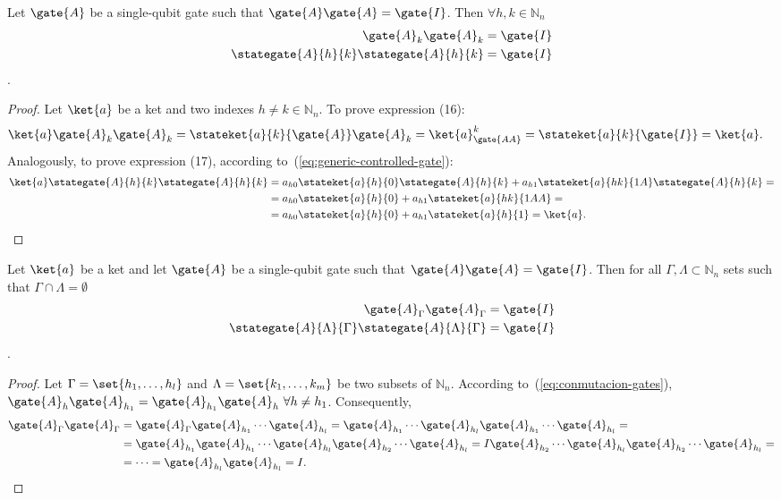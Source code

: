 \documentclass[sigconf,natbib=false]{acmart}
\begin{document}
\begin{proposition}
	Let $\gate{A}$ be a single-qubit gate such that $\gate{A}\gate{A}=\gate{I}$. Then $\forall h,k \in \mathbb{N}_n$
	\begin{align}
		\label{eq:puerta-involutiva}
		\gate{A}_k\gate{A}_k &= \gate{I}\\
		\stategate{A}{h}{k}\stategate{A}{h}{k} &= \gate{I}
	\end{align}
	.
\end{proposition}
\begin{proof}
	Let $\ket{a}$ be a ket and two indexes $h\neq k \in \mathbb{N}_n$.
	To prove expression (16):
	\begin{align*}
		\ket{a}\gate{A}_k\gate{A}_k
		&=\stateket{a}{k}{\gate{A}}\gate{A}_k=\ket{a}^k_{\gate{AA}}=\stateket{a}{k}{\gate{I}}=\ket{a}.
	\end{align*}
	Analogously, to prove expression (17), according to~(\ref{eq:generic-controlled-gate}):
	\begin{align*}
		\ket{a}\stategate{A}{h}{k}\stategate{A}{h}{k}
		&=a_{h0}\stateket{a}{h}{0}\stategate{A}{h}{k}+a_{h1}\stateket{a}{hk}{1A}\stategate{A}{h}{k}=\\
		&=a_{h0}\stateket{a}{h}{0}+a_{h1}\stateket{a}{hk}{1AA}=\\
		&=a_{h0}\stateket{a}{h}{0}+a_{h1}\stateket{a}{h}{1}=\ket{a}.
	\end{align*}
\end{proof}

\begin{proposition}
	Let $\ket{a}$ be a ket and let $\gate{A}$ be a single-qubit gate such that $\gate{A}\gate{A}=\gate{I}$.
	Then for all $\Gamma, \Lambda \subset \mathbb{N}_n$ sets such that $\Gamma\cap\Lambda=\emptyset$
	\begin{align}
		\label{eq:puerta-set-involutiva}
		\gate{A}_\Gamma\gate{A}_\Gamma &= \gate{I}\\
		\label{eq:cpuerta-set-involutiva}
		\stategate{A}{\Lambda}{\Gamma}\stategate{A}{\Lambda}{\Gamma} &= \gate{I}
	\end{align}.
	\end{proposition}
\begin{proof}
	Let $\Gamma=\set{h_1,\dots,h_l}$ and $\Lambda=\set{k_1,\dots,k_m}$ be two subsets of $\mathbb{N}_n$.
	According to~(\ref{eq:conmutacion-gates}), $\gate{A}_{h}\gate{A}_{h_1}=\gate{A}_{h_1}\gate{A}_{h}\ \forall h\neq h_1$.
	Consequently,
	\begin{align*}
		\gate{A}_{\Gamma}\gate{A}_{\Gamma}&=\gate{A}_{\Gamma}\gate{A}_{h_1}\cdots\gate{A}_{h_l}=\gate{A}_{h_1}\cdots\gate{A}_{h_l}\gate{A}_{h_1}\cdots\gate{A}_{h_l} = \\
		&= \gate{A}_{h_1}\gate{A}_{h_1}\cdots\gate{A}_{h_l}\gate{A}_{h_2}\cdots\gate{A}_{h_l} =
		I\gate{A}_{h_2}\cdots\gate{A}_{h_l}\gate{A}_{h_2}\cdots\gate{A}_{h_l} = \\
		&= \dots = \gate{A}_{h_l}\gate{A}_{h_l} = I.
	\end{align*}

\end{proof}
\end{document}
